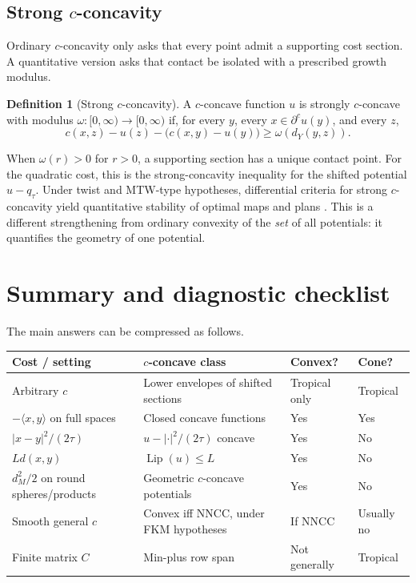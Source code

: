 \documentclass[11pt,a4paper]{article}
\theoremstyle{definition}
\newtheorem{definition}[theorem]{Definition}
\theoremstyle{remark}
\newcommand{\Lip}{\operatorname{Lip}}
\begin{document}
\subsection[Strong c-concavity]{Strong $c$-concavity}

Ordinary $c$-concavity only asks that every point admit a supporting cost
section. A quantitative version asks that contact be isolated with a prescribed
growth modulus.

\begin{definition}[Strong $c$-concavity]
A $c$-concave function $u$ is strongly $c$-concave with modulus
$\omega:[0,\infty)\to[0,\infty)$ if, for every $y$, every
$x\in\partial^cu(y)$, and every $z$,
\[
  c(x,z)-u(z)-\bigl(c(x,y)-u(y)\bigr)
  \geq \omega(d_Y(y,z)).
\]
\end{definition}

When $\omega(r)>0$ for $r>0$, a supporting section has a unique contact point.
For the quadratic cost, this is the strong-concavity inequality for the shifted
potential $u-q_\tau$. Under twist and MTW-type hypotheses, differential
criteria for strong $c$-concavity yield quantitative stability of optimal maps
and plans \citep{GallouetMerigotThibert2026}. This is a different strengthening
from ordinary convexity of the \emph{set} of all potentials: it quantifies the
geometry of one potential.

\section{Summary and diagnostic checklist}

The main answers can be compressed as follows.

\begin{center}
\small
\begin{tabularx}{\linewidth}{@{}>{\raggedright\arraybackslash}p{.23\linewidth}
  >{\raggedright\arraybackslash}X
  >{\centering\arraybackslash}p{.11\linewidth}
  >{\centering\arraybackslash}p{.10\linewidth}@{}}
\toprule
Cost / setting & $c$-concave class & Convex? & Cone? \\
\midrule
Arbitrary $c$ & Lower envelopes of shifted sections & Tropical only & Tropical \\
$-\langle x,y\rangle$ on full spaces & Closed concave functions & Yes & Yes \\
$\lvert x-y\rvert^2/(2\tau)$ & $u-\lvert\cdot\rvert^2/(2\tau)$ concave & Yes & No \\
$Ld(x,y)$ & $\Lip(u)\leq L$ & Yes & No \\
$d_M^2/2$ on round spheres/products & Geometric $c$-concave potentials & Yes & No \\
Smooth general $c$ & Convex iff NNCC, under FKM hypotheses & If NNCC & Usually no \\
Finite matrix $C$ & Min-plus row span & Not generally & Tropical \\
\bottomrule
\end{tabularx}
\end{center}
\end{document}
